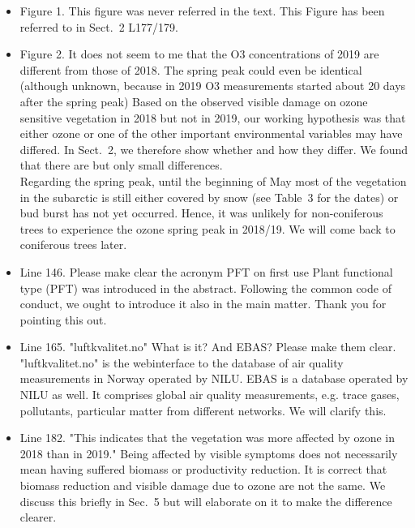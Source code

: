 \documentclass{scrartcl}
\begin{document}
\begin{itemize}
\item {\color{blue}Figure 1. This figure was never referred in the text.}
This Figure has been referred to in Sect.~2 L177/179.

\item {\color{blue}Figure 2. It does not seem to me that the O3 concentrations of 2019 are different from those of 2018. The spring peak could even be identical (although unknown, because in 2019 O3 measurements started about 20 days after the spring peak)}
Based on the observed visible damage on ozone sensitive vegetation in 2018 but not in 2019, our working hypothesis was that either ozone or one of the other important environmental variables may have differed. In Sect.~2, we therefore show whether and how they differ. We found that there are but only small differences.\\
Regarding the spring peak, until the beginning of May most of the vegetation in the subarctic is still either covered by snow (see Table~3 for the dates) or bud burst has not yet occurred. Hence, it was unlikely for non-coniferous trees to experience the ozone spring peak in 2018/19. We will come back to coniferous trees later. 

\item {\color{blue}Line 146. Please make clear the acronym PFT on first use}
Plant functional type (PFT) was introduced in the abstract. Following the common code of conduct, we ought to introduce it also in the main matter. Thank you for pointing this out.

\item {\color{blue}Line 165. "luftkvalitet.no" What is it? And EBAS? Please make them clear.}
"luftkvalitet.no" is the webinterface to the database of air quality measurements in Norway operated by NILU. EBAS is a database operated by NILU as well. It comprises global air quality measurements, e.g. trace gases, pollutants, particular matter from different networks. We will clarify this.

\item {\color{blue}Line 182. "This indicates that the vegetation was more affected by ozone in 2018 than in 2019." Being affected by visible symptoms does not necessarily mean having suffered biomass or productivity reduction.} It is correct that biomass reduction and visible damage due to ozone are not the same. We discuss this briefly in Sec.~5 but will elaborate on it to make the difference clearer. 


\end{itemize}
\end{document}
